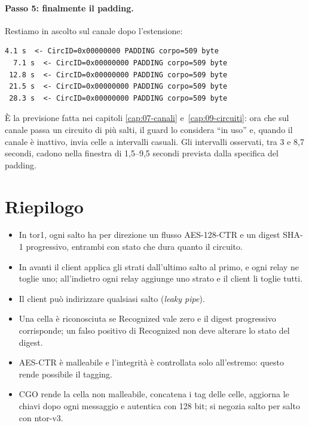 \paragraph{Passo 5: finalmente il padding.} Restiamo in ascolto sul canale dopo l'estensione:
\begin{lstlisting}[numbers=none]
  4.1 s  <- CircID=0x00000000 PADDING corpo=509 byte
  7.1 s  <- CircID=0x00000000 PADDING corpo=509 byte
 12.8 s  <- CircID=0x00000000 PADDING corpo=509 byte
 21.5 s  <- CircID=0x00000000 PADDING corpo=509 byte
 28.3 s  <- CircID=0x00000000 PADDING corpo=509 byte
\end{lstlisting}
È la previsione fatta nei capitoli \ref{cap:07-canali} e~\ref{cap:09-circuiti}: ora che sul canale passa un circuito di più salti, il guard lo considera \enquote{in uso} e, quando il canale è inattivo, invia celle  a intervalli casuali. Gli intervalli osservati, tra 3 e 8,7 secondi, cadono nella finestra di 1,5--9,5 secondi prevista dalla specifica del padding.

\section*{Riepilogo}
\begin{itemize}
  \item In tor1, ogni salto ha per direzione un flusso AES-128-CTR e un digest SHA-1 progressivo, entrambi con stato che dura quanto il circuito.
  \item In avanti il client applica gli strati dall'ultimo salto al primo, e ogni relay ne toglie uno; all'indietro ogni relay aggiunge uno strato e il client li toglie tutti.
  \item Il client può indirizzare qualsiasi salto (\emph{leaky pipe}).
  \item Una cella è riconosciuta se Recognized vale zero e il digest progressivo corrisponde; un falso positivo di Recognized non deve alterare lo stato del digest.
  \item AES-CTR è malleabile e l'integrità è controllata solo all'estremo: questo rende possibile il tagging.
  \item CGO rende la cella non malleabile, concatena i tag delle celle, aggiorna le chiavi dopo ogni messaggio e autentica con 128 bit; si negozia salto per salto con ntor-v3.
\end{itemize}

